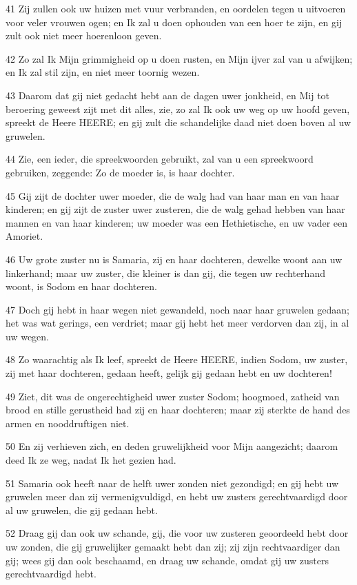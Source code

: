 \par 41 Zij zullen ook uw huizen met vuur verbranden, en oordelen tegen u uitvoeren voor veler vrouwen ogen; en Ik zal u doen ophouden van een hoer te zijn, en gij zult ook niet meer hoerenloon geven.
\par 42 Zo zal Ik Mijn grimmigheid op u doen rusten, en Mijn ijver zal van u afwijken; en Ik zal stil zijn, en niet meer toornig wezen.
\par 43 Daarom dat gij niet gedacht hebt aan de dagen uwer jonkheid, en Mij tot beroering geweest zijt met dit alles, zie, zo zal Ik ook uw weg op uw hoofd geven, spreekt de Heere HEERE; en gij zult die schandelijke daad niet doen boven al uw gruwelen.
\par 44 Zie, een ieder, die spreekwoorden gebruikt, zal van u een spreekwoord gebruiken, zeggende: Zo de moeder is, is haar dochter.
\par 45 Gij zijt de dochter uwer moeder, die de walg had van haar man en van haar kinderen; en gij zijt de zuster uwer zusteren, die de walg gehad hebben van haar mannen en van haar kinderen; uw moeder was een Hethietische, en uw vader een Amoriet.
\par 46 Uw grote zuster nu is Samaria, zij en haar dochteren, dewelke woont aan uw linkerhand; maar uw zuster, die kleiner is dan gij, die tegen uw rechterhand woont, is Sodom en haar dochteren.
\par 47 Doch gij hebt in haar wegen niet gewandeld, noch naar haar gruwelen gedaan; het was wat gerings, een verdriet; maar gij hebt het meer verdorven dan zij, in al uw wegen.
\par 48 Zo waarachtig als Ik leef, spreekt de Heere HEERE, indien Sodom, uw zuster, zij met haar dochteren, gedaan heeft, gelijk gij gedaan hebt en uw dochteren!
\par 49 Ziet, dit was de ongerechtigheid uwer zuster Sodom; hoogmoed, zatheid van brood en stille gerustheid had zij en haar dochteren; maar zij sterkte de hand des armen en nooddruftigen niet.
\par 50 En zij verhieven zich, en deden gruwelijkheid voor Mijn aangezicht; daarom deed Ik ze weg, nadat Ik het gezien had.
\par 51 Samaria ook heeft naar de helft uwer zonden niet gezondigd; en gij hebt uw gruwelen meer dan zij vermenigvuldigd, en hebt uw zusters gerechtvaardigd door al uw gruwelen, die gij gedaan hebt.
\par 52 Draag gij dan ook uw schande, gij, die voor uw zusteren geoordeeld hebt door uw zonden, die gij gruwelijker gemaakt hebt dan zij; zij zijn rechtvaardiger dan gij; wees gij dan ook beschaamd, en draag uw schande, omdat gij uw zusters gerechtvaardigd hebt.
